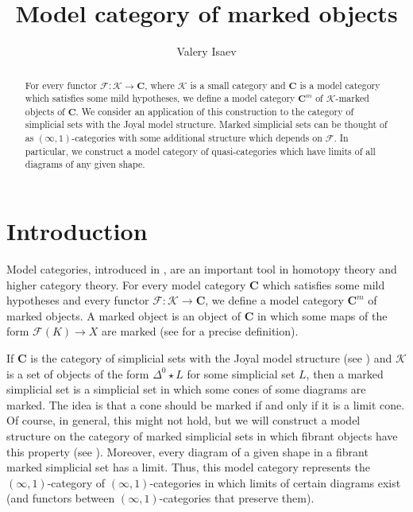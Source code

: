 \documentclass[reqno]{amsart}
\theoremstyle{definition}
\theoremstyle{remark}
\newcommand{\cat}[1]{\mathbf{#1}}
\newcommand{\C}{\cat{C}}
\newcommand{\K}{$\mathcal{K}$}
\newcommand{\join}{\star}
\numberwithin{figure}{section}
\begin{document}
\title{Model category of marked objects}

\author{Valery Isaev}

\begin{abstract}
For every functor $\mathcal{F} : \mathcal{K} \to \mathbf{C}$, where $\mathcal{K}$ is a small category and $\mathbf{C}$ is a model category which satisfies some mild hypotheses,
we define a model category $\mathbf{C}^m$ of $\mathcal{K}$-marked objects of $\mathbf{C}$.
We consider an application of this construction to the category of simplicial sets with the Joyal model structure.
Marked simplicial sets can be thought of as $(\infty,1)$-categories with some additional structure which depends on $\mathcal{F}$.
In particular, we construct a model category of quasi-categories which have limits of all diagrams of any given shape.
\end{abstract}

\maketitle

\section{Introduction}

Model categories, introduced in \cite{quillen}, are an important tool in homotopy theory and higher category theory.
For every model category $\C$ which satisfies some mild hypotheses and every functor $\mathcal{F} : \mathcal{K} \to \C$, we define a model category $\C^m$ of marked objects.
A marked object is an object of $\C$ in which some maps of the form $\mathcal{F}(K) \to X$ are marked (see  for a precise definition).

If $\C$ is the category of simplicial sets with the Joyal model structure (see \cite{Joyal,lurie-topos})
and \K is a set of objects of the form $\Delta^0 \join L$ for some simplicial set $L$,
then a marked simplicial set is a simplicial set in which some cones of some diagrams are marked.
The idea is that a cone should be marked if and only if it is a limit cone.
Of course, in general, this might not hold, but we will construct a model structure on the category of marked simplicial sets in which fibrant objects have this property (see ).
Moreover, every diagram of a given shape in a fibrant marked simplicial set has a limit.
Thus, this model category represents the $(\infty,1)$-category of $(\infty,1)$-categories in which limits of certain diagrams exist (and functors between $(\infty,1)$-categories that preserve them).
\end{document}
